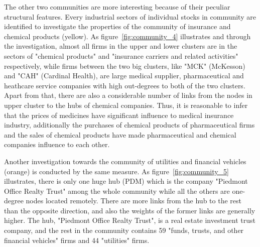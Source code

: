 The other two communities are more interesting because of their peculiar structural features. Every industrial sectors of individual stocks in community are identified to investigate the properties of the community of insurance and chemical products (yellow). As figure~\ref{fig:community_4} illustrates and through the investigation, almost all firms in the upper and lower clusters are in the sectors of "chemical products" and "insurance carriers and related activities" respectively, while firms between the two big clusters, like "MCK" (McKesson) and "CAH" (Cardinal Health), are large medical supplier, pharmaceutical and heathcare service companies with high out-degrees to both of the two clusters. Apart from that, there are also a considerable number of links from the nodes in upper cluster to the hubs of chemical companies. Thus, it is reasonable to infer that the prices of medicines have significant influence to medical insurance industry, additionally the purchases of chemical products of pharmaceutical firms and the sales of chemical products have made pharmaceutical and chemical companies influence to each other.

Another investigation towards the community of utilities and financial vehicles (orange) is conducted by the same measure. As figure~\ref{fig:community_5} illustrates, there is only one huge hub (PDM) which is the company "Piedmont Office Realty Trust" among the whole community while all the others are one-degree nodes located remotely. There are more links from the hub to the rest than the opposite direction, and also the weights of the former links are generally higher. The hub, "Piedmont Office Realty Trust", is a real estate investment trust company, and the rest in the community contains 59 "funds, trusts, and other financial vehicles" firms and 44 "utilities" firms. %

